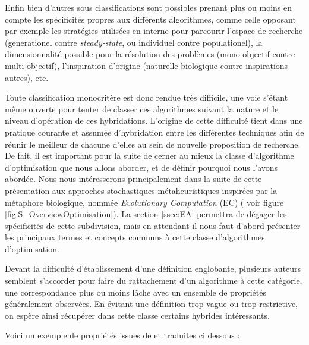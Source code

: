 Enfin bien d'autres sous classifications sont possibles prenant plus ou moins en compte les spécificités propres aux différents algorithmes, comme celle opposant par exemple les stratégies utilisées en interne pour parcourir l'espace de recherche (generationel contre \textit{steady-state}, ou individuel contre populationel), la dimensionnalité possible pour la résolution des problèmes (mono-objectif contre multi-objectif), l'inspiration d'origine (naturelle biologique contre inspirations autres), etc.

Toute classification monocritère est donc rendue très difficile, une voie s'étant même ouverte pour tenter de classer ces algorithmes suivant la nature et le niveau d'opération de ces hybridations. L'origine de cette difficulté tient dans une pratique courante et assumée d'hybridation entre les différentes techniques afin de réunir le meilleur de chacune d'elles au sein de nouvelle proposition de recherche. De fait, il est important pour la suite de cerner au mieux la classe d'algorithme d'optimisation que nous allons aborder, et de définir pourquoi nous l'avons abordée. Nous nous intéresserons principalement dans la suite de cette présentation aux approches stochastiques métaheuristiques inspirées par la métaphore biologique, nommée \textit{Evolutionary Computation} (EC) ( voir figure \ref{fig:S_OverviewOptimisation}). La section \ref{ssec:EA} permettra de dégager les spécificités de cette subdivision, mais en attendant il nous faut d'abord présenter les principaux termes et concepts communs à cette classe d'algorithmes d'optimisation.

Devant la difficulté d'établissement d'une définition englobante, plusieurs auteurs semblent s'accorder pour faire du rattachement d'un algorithme à cette catégorie, une correspondance plus ou moins lâche avec un ensemble de propriétés généralement observées. En évitant une définition trop vague ou trop restrictive, on espère ainsi récupérer dans cette classe certains hybrides intéressants.

Voici un exemple de propriétés issues de \textcite{Blum2003} et traduites ci dessous :

